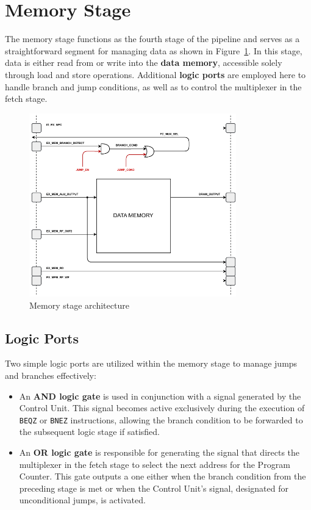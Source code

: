 
\newpage
\section{Memory Stage}
The memory stage functions as the fourth stage of the pipeline and serves as a straightforward segment for managing data as shown in Figure~\ref{fig:04_memory}. In this stage, data is either read from or write into the \textbf{data memory}, accessible solely through load and store operations. Additional \textbf{logic ports} are employed here to handle branch and jump conditions, as well as to control the multiplexer in the fetch stage.

\begin{figure}[!htbp]
    \centering
    \includegraphics[width=0.8\textwidth]{source/figures/04_memory.pdf}
    \caption{Memory stage architecture}
    \label{fig:04_memory}
\end{figure}

\subsection{Logic Ports}
Two simple logic ports are utilized within the memory stage to manage jumps and branches effectively:
\begin{itemize}
    \item An \textbf{AND logic gate} is used in conjunction with a signal generated by the Control Unit. This signal becomes active exclusively during the execution of \texttt{BEQZ} or \texttt{BNEZ} instructions, allowing the branch condition to be forwarded to the subsequent logic stage if satisfied.
    \item An \textbf{OR logic gate} is responsible for generating the signal that directs the multiplexer in the fetch stage to select the next address for the Program Counter. This gate outputs a one either when the branch condition from the preceding stage is met or when the Control Unit's signal, designated for unconditional jumps, is activated.
\end{itemize}

